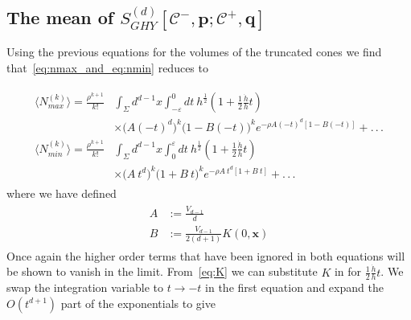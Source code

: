 \documentclass[12pt]{article}
\begin{document}
\subsection{The mean of $S^{(d)}_{GHY}[\mathcal {C}^-,\mathbf{p};\mathcal{C}^+,\mathbf{q}]$}

Using the previous equations for the volumes of the truncated cones we find that~\eqref{eq:nmax_and_eq:nmin} reduces to

\begin{gather}\label{eq:nmax_and_eq:nmin_volume_expanded}
\begin{aligned}
\langle N_{max}^{(k)}\rangle = \frac{\rho^{k+1}}{k!} & \int_{\Sigma}d^{d-1}x\int_{-\varepsilon}^{0}dt\:
h^{\frac{1}{2}}\left(1+
\frac{1}{2}\frac{\dot{h}}{h}t\right)
 \\
 & \times \Big( A(-t)^d \Big)^k 
 \Big( 1 - B(-t) \Big)^k
 e^{-\rho A(-t)^d \left[1-B(-t) \right]} + .\,.\,.
\\
\langle N_{min}^{(k)}\rangle = \frac{\rho^{k+1}}{k!} & \int_{\Sigma}d^{d-1}x\int_{0}^{\varepsilon}dt\:
h^{\frac{1}{2}}\left(1+
\frac{1}{2}\frac{\dot{h}}{h}t\right)
 \\
 & \times \Big( A\: t^d \Big)^k 
 \Big( 1 + B\: t \Big)^k
 e^{-\rho A\: t^d \left[1+B\: t \right]} + .\,.\,.
\end{aligned}
\end{gather}
where we have defined
\begin{gather}\label{A_and_B_defn}
\begin{aligned}
A & := \frac{V_{d-1}}{d} \\
B & := \frac{V_{d-1}}{2(d+1)}K(0,\mathbf{x})
\end{aligned}
\end{gather}
Once again the higher order terms that have been ignored in both equations will be shown to vanish in the limit. From~\eqref{eq:K} we can substitute $K$ in for $\frac{1}{2}\frac{\dot{h}}{h}t$. We swap the integration variable to $t\rightarrow -t$ in the first equation and expand the $O(t^{d+1})$ part of the exponentials to give
\end{document}
